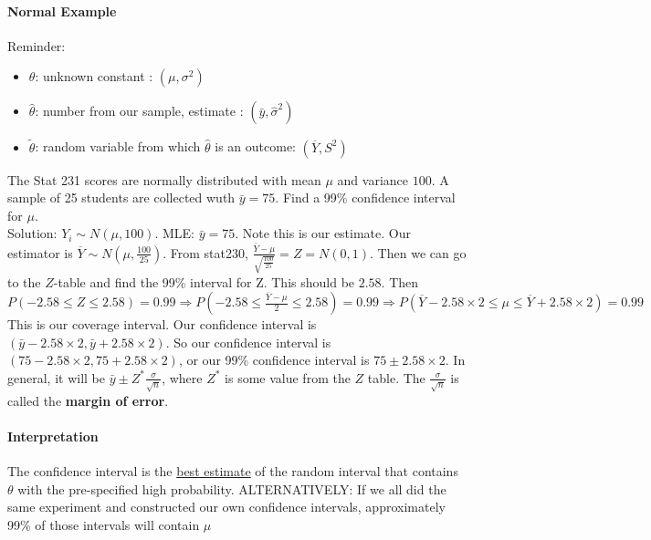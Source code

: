 \documentclass[10pt,letter]{article}
\theoremstyle{plain}
\theoremstyle{definition}
\begin{document}
\paragraph{Normal Example}
Reminder: \begin{itemize}
    \item $\theta$: unknown constant : $(\mu,\sigma^2)$
    \item $\hat{\theta}$: number from our sample, estimate : $(\bar{y},\hat\sigma^2)$
    \item $\tilde{\theta}$: random variable from which $\hat{\theta}$ is an outcome: $(\overline{Y},S^2)$
\end{itemize}
The Stat 231 scores are normally distributed with mean $\mu$ and variance $100$. A sample of 25 students are collected wuth $\bar{y}=75$. Find a 99\% confidence interval for $\mu$. \\ 
Solution: $Y_i\sim N(\mu,100)$. MLE: $\bar{y}=75$. Note this is our estimate. Our estimator is $\overline{Y}\sim N\left(\mu,\frac{100}{25}\right)$. From stat230, $\frac{\overline{Y}-\mu}{\sqrt{\frac{100}{25}}}=Z=N(0,1)$. Then we can go to the $Z$-table and find the 99\% interval for Z. This should be $2.58$. Then $P(-2.58\leq Z\leq2.58)=0.99\Rightarrow P(-2.58\leq\frac{\overline{Y}-\mu}{2}\leq2.58)=0.99\Rightarrow P(\overline{Y}-2.58\times2\leq\mu\leq\overline{Y}+2.58\times2)=0.99$ This is our coverage interval. Our confidence interval is $(\bar{y}-2.58\times2,\bar{y}+2.58\times2)$. So our confidence interval is $(75-2.58\times2,75+2.58\times2)$, or our 99\% confidence interval is $75\pm2.58\times2$. In general, it will be $\bar{y}\pm Z^*\frac{\sigma}{\sqrt{n}}$, where $Z^*$ is some value from the $Z$ table. The $\frac{\sigma}{\sqrt{n}}$ is called the \textbf{margin of error}.

\paragraph{Interpretation}
The confidence interval is the \underline{best estimate} of the random interval that contains $\theta$ with the pre-specified high probability. ALTERNATIVELY: If we all did the same experiment and constructed our own confidence intervals, approximately 99\% of those intervals will contain $\mu$ 
\end{document}
